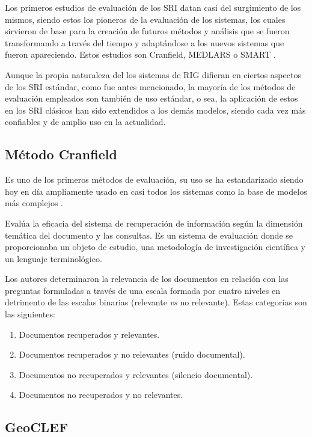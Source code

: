 \documentclass{llncs}
\begin{document}
Los primeros estudios de evaluación de los SRI datan casi del surgimiento de
los mismos, siendo estos los pioneros de la evaluación de los sistemas, los
cuales sirvieron de base para la creación de futuros métodos y análisis que
se fueron transformando a través del tiempo y adaptándose a los nuevos
sistemas que fueron apareciendo. Estos estudios son Cranfield,
MEDLARS o SMART \cite{bors2000}.

Aunque la propia naturaleza del los sistemas de RIG difieran en ciertos aspectos
de los SRI estándar, como fue antes mencionado, la mayoría de los
métodos de evaluación empleados son también de uso estándar, o sea, la
aplicación de estos en los SRI clásicos han sido extendidos a los
demás modelos, siendo cada vez más confiables y de amplio uso en la actualidad.

\subsection{Método Cranfield}\label{sec:Cranfield}

Es uno de los primeros métodos de evaluación, su uso se ha estandarizado 
siendo hoy en día ampliamente usado en casi todos los sistemas como la base de
modelos más complejos \cite{hosseini2013}.

Evalúa la eficacia del sistema de recuperación de información según la
dimensión temática del documento y las consultas. Es un sistema de evaluación
donde se proporcionaba un objeto de estudio, una metodología de investigación
científica y un lenguaje terminológico.

Los autores determinaron la relevancia de los documentos en relación
con las preguntas formuladas a través de una escala formada por cuatro niveles
en detrimento de las escalas binarias (relevante \emph{vs} no relevante).
Estas categorías son las siguientes: 

\begin{enumerate}
    \item Documentos recuperados y relevantes.
    \item Documentos recuperados y no relevantes (ruido documental).
    \item Documentos no recuperados y relevantes (silencio documental).
    \item Documentos no recuperados y no relevantes. 
\end{enumerate}

\subsection{GeoCLEF}\label{sec:GeoCLEF}
\end{document}
